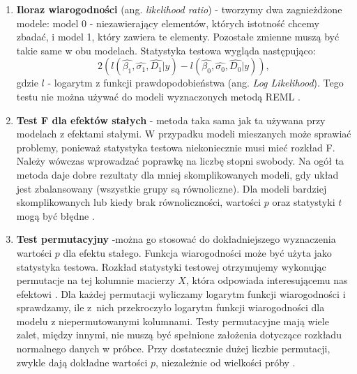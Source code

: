 \documentclass[12pt]{mwbk}
\theoremstyle{plain}
\theoremstyle{definition}
\theoremstyle{definition}
\begin{document}
\begin{enumerate}
	\item \textbf{Iloraz wiarogodności} (ang. \textit{likelihood ratio}) - tworzymy dwa zagnieżdżone modele: model 0 - niezawierający elementów, których istotność chcemy zbadać, i model 1, który zawiera te elementy. Pozostałe zmienne muszą być takie same w obu modelach.
	Statystyka testowa wygląda następująco:
	$$2(l(\hat{\beta_1}, \hat{\sigma_1}, \hat{D_1}|y)-l(\hat{\beta_0}, \hat{\sigma_0}, \hat{D_0}|y)),$$
	gdzie $l$ - logarytm z funkcji prawdopodobieństwa (ang. \textit{Log Likelihood}). Tego testu nie można używać do modeli wyznaczonych metodą REML \cite{faraway}.
	
	\item \textbf{Test F dla efektów stałych} - metoda taka sama jak ta używana przy modelach z efektami stałymi. W przypadku modeli mieszanych może sprawiać problemy, ponieważ statystyka testowa niekoniecznie musi mieć rozkład F. Należy wówczas wprowadzać poprawkę na liczbę stopni swobody. Na ogół ta metoda daje dobre rezultaty dla mniej skomplikowanych modeli, gdy układ jest zbalansowany (wszystkie grupy są równoliczne). Dla modeli bardziej skomplikowanych lub kiedy brak równoliczności, wartości $p$ oraz statystyki $t$ mogą być błędne \cite{faraway}.
	
	\item \textbf{Test permutacyjny} -można go stosować do dokładniejszego wyznaczenia wartości $p$ dla efektu stałego. Funkcja wiarogodności może być użyta jako statystyka testowa. Rozkład statystyki testowej otrzymujemy wykonując permutacje na tej kolumnie macierzy $X$, która odpowiada interesującemu nas efektowi \cite{biecek}. Dla każdej permutacji wyliczamy logarytm funkcji wiarogodności i sprawdzamy, ile z~nich przekroczyło logarytm funkcji wiarogodności dla modelu z niepermutowanymi kolumnami. Testy permutacyjne mają wiele zalet, między innymi, nie muszą być spełnione założenia dotyczące rozkładu normalnego danych w próbce. Przy dostatecznie dużej liczbie permutacji, zwykle dają dokładne wartości $p$, niezależnie od wielkości próby \cite{bootstrap}.
	



\end{enumerate}
\end{document}
